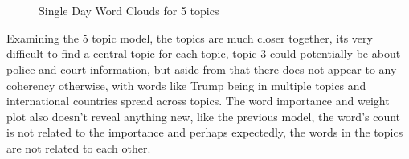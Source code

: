 \begin{figure}[H]
	\centering
	\\
	\\
	
	\caption{Single Day Word Clouds for 5 topics}
	\label{fig:single5}
\end{figure}	

Examining the 5 topic model, the topics are much closer together, its very difficult to find a central topic for each topic, topic 3 could potentially be about police and court information, but aside from that there does not appear to any coherency otherwise, with words like Trump being in multiple topics and international countries spread across topics. The word importance and weight plot also doesn't reveal anything new, like the previous model, the word's count is not related to the importance and perhaps expectedly, the words in the topics are not related to each other.

